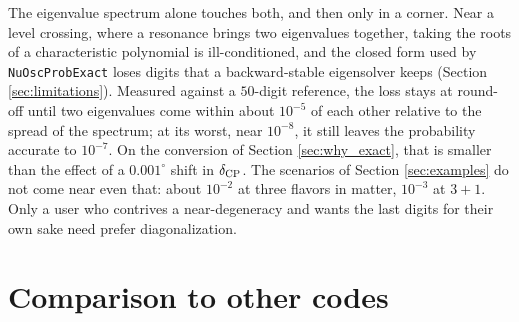 \documentclass[final,5p,times,twocolumn,sort,compress]{elsarticle}
\begin{document}
The eigenvalue spectrum alone touches both, and then only in a corner.  Near a level crossing, where a resonance brings two eigenvalues together, taking the roots of a characteristic polynomial is ill-conditioned, and the closed form used by {\tt NuOscProbExact} loses digits that a backward-stable eigensolver keeps (Section \ref{sec:limitations}).  Measured against a $50$-digit reference, the loss stays at round-off until two eigenvalues come within about $10^{-5}$ of each other relative to the spread of the spectrum; at its worst, near $10^{-8}$, it still leaves the probability accurate to $10^{-7}$. On the conversion of Section \ref{sec:why_exact}, that is smaller than the effect of a $0.001^\circ$ shift in $\delta_{\rm CP}$.  The scenarios of Section \ref{sec:examples} do not come near even that: about $10^{-2}$ at three flavors in matter, $10^{-3}$ at $3+1$.  Only a user who contrives a near-degeneracy and wants the last digits for their own sake need prefer diagonalization.


\section{Comparison to other codes}
\label{sec:comparison}
\end{document}
